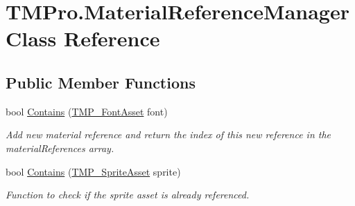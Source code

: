 \hypertarget{class_t_m_pro_1_1_material_reference_manager}{}\section{T\+M\+Pro.\+Material\+Reference\+Manager Class Reference}
\label{class_t_m_pro_1_1_material_reference_manager}
\subsection*{Public Member Functions}
\begin{DoxyCompactItemize}
\item 
bool \mbox{\hyperlink{class_t_m_pro_1_1_material_reference_manager_a573b9237cc9247f29300bd6074fa6cb0}{Contains}} (\mbox{\hyperlink{class_t_m_pro_1_1_t_m_p___font_asset}{T\+M\+P\+\_\+\+Font\+Asset}} font)
\begin{DoxyCompactList}\small\item\em Add new material reference and return the index of this new reference in the material\+References array. \end{DoxyCompactList}\item 
bool \mbox{\hyperlink{class_t_m_pro_1_1_material_reference_manager_a900e5d78f7716ac071050558f4f838fa}{Contains}} (\mbox{\hyperlink{class_t_m_pro_1_1_t_m_p___sprite_asset}{T\+M\+P\+\_\+\+Sprite\+Asset}} sprite)
\begin{DoxyCompactList}\small\item\em Function to check if the sprite asset is already referenced. \end{DoxyCompactList}\end{DoxyCompactItemize}
